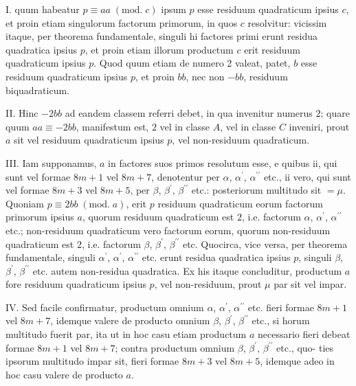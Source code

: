 \documentclass[twoside,12pt, showframe]{memoir}
\renewcommand{\pmod}[1]{\;(\textrm{mod.}\;#1)}
\begin{document}
I. quum habeatur \(p \equiv a a \pmod{{c}}\) ipsum \(p\) esse residuum quadraticum ipsius \(c\), et proin etiam singulorum factorum primorum, in quos \(c\) resolvitur: vicissim itaque, per theorema fundamentale, singuli hi factores primi erunt residua quadratica ipsius \(p\), et proin etiam illorum productum \(c\) erit residuum quadraticum ipsius \(p\). Quod quum etiam de numero 2 valeat, patet, \(b\) esse residuum quadraticum ipsius \(p\), et proin \(b b\), nec non \(-b b\), residuum biquadraticum.
 
II. Hinc \(-2 b b\) ad eandem classem referri debet, in qua invenitur numerus \(2\); quare quum \(a a \equiv-2 b b\), manifestum est, \(2\) vel in classe \(A\), vel in classe \(C\) inveniri, prout \(a\) sit vel residuum quadraticum ipsius \(p\), vel non-residuum quadraticum.
 
III. Iam supponamus, \(a\) in factores suos primos resolutum esse, e quibus ii, qui sunt vel formae \(8 m+1\) vel \(8 m+7\), denotentur per \(\alpha\), \(\alpha^{\prime}\), \(\alpha^{\prime \prime}\) etc., ii vero, qui sunt vel formae \(8 m+3\) vel \(8 m+5\), per \(\beta\), \(\beta^{\prime}\), \(\beta^{\prime \prime}\) etc.: posteriorum multitudo sit \(=\mu\). Quoniam \(p \equiv 2 b b \pmod{a}\), erit \(p\) residuum quadraticum eorum factorum primorum ipsius \(a\), quorum residuum quadraticum est \(2\), i.e. factorum \(\alpha\), \(\alpha^{\prime}\), \(\alpha^{\prime \prime}\) etc.; non-residuum quadraticum vero factorum eorum, quorum non-residuum quadraticum est \(2\), i.e. factorum \(\beta\), \(\beta^{\prime}\), \(\beta^{\prime \prime}\) etc. Quocirca, vice versa, per theorema fundamentale, singuli \(\alpha^{\prime}\), \(\alpha^{\prime}\), \(\alpha^{\prime \prime}\) etc. erunt residua quadratica ipsius \(p\), singuli \(\beta\), \(\beta^{\prime}\), \(\beta^{\prime \prime}\) etc. autem non-residua quadratica. Ex his itaque concluditur, productum \(a\) fore residuum quadraticum ipsius \(p\), vel non-residuum, prout \(\mu\) par sit vel impar.
 
IV. Sed facile confirmatur, productum omnium \(\alpha\), \(\alpha^{\prime}\), \(\alpha^{\prime \prime}\) etc. fieri formae \(8 m+1\) vel \(8 m+7\), idemque valere de producto omnium \(\beta\), \(\beta^{\prime}\), \(\beta^{\prime \prime}\) etc., si horum multitudo fuerit par, ita ut in hoc casu etiam productum \(a\) necessario fieri debeat formae \(8 m+1\) vel \(8 m+7\); contra productum omnium \(\beta\), \(\beta^{\prime}\), \(\beta^{\prime \prime}\) etc., quo-\clearpage\noindent%
ties ipsorum multitudo impar sit, fieri formae \(8 m+3\) vel \(8 m+5\), idemque adeo in hoc casu valere de producto \(a\).
\end{document}
